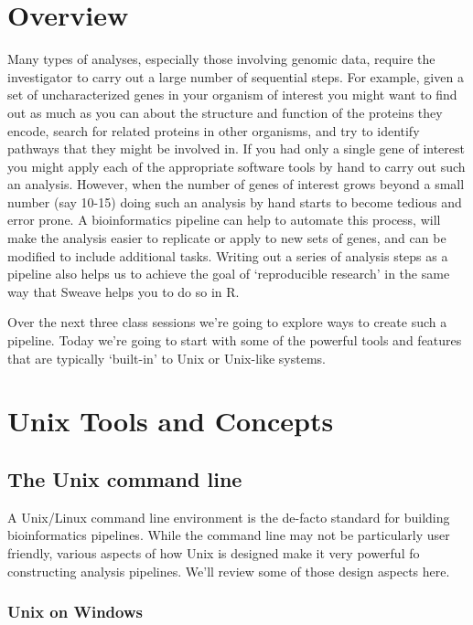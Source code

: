 
 
\section{Overview}

Many types of analyses, especially those involving genomic data, require the investigator to carry out a large number of sequential steps. For example, given a set of uncharacterized genes in your organism of interest you might want to find out as much as you can about the structure and function of the proteins they encode, search for related proteins in other organisms, and try to identify pathways that they might be involved in. If you had only a single gene of interest you might apply each of the appropriate software tools by hand to carry out such an analysis. However, when the number of genes of interest grows beyond a small number (say 10-15) doing such an analysis by hand starts to become tedious and error prone.  A bioinformatics pipeline can help to automate this process, will make the analysis easier to replicate or apply to new sets of genes, and can be modified to include additional tasks.  Writing out a series of analysis steps as a pipeline also helps us to achieve the goal of `reproducible research' in the same way that Sweave helps you to do so in R.

Over the next three class sessions we're going to explore ways to create such a pipeline. Today we're going to start with some of the powerful tools and features that are typically `built-in' to Unix or Unix-like systems.

\section{Unix Tools and Concepts}

\subsection{The Unix command line}

A Unix/Linux command line environment is the de-facto standard for building bioinformatics pipelines. While the command line may not be particularly user friendly, various aspects of how Unix is designed make it very powerful fo constructing analysis pipelines.  We'll review some of those design aspects here.


\subsubsection{Unix on Windows}

